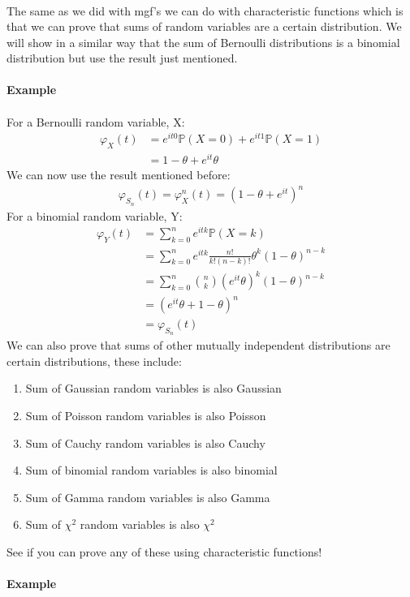 \documentclass[,oneside]{article}
\begin{document}
\begin{enumerate}
\begin{align*}
\end{align*}
The same as we did with mgf's we can do with characteristic functions which is that we can prove that sums of random variables are a certain distribution. We will show in a similar way that the sum of Bernoulli distributions is a binomial distribution but use the result just mentioned.\\ \\
\textbf{Example}\\ \\
For a Bernoulli random variable, X:
\begin{align*}
\varphi_X(t)&=e^{it 0}\mathbb{P}(X=0)+e^{it 1}\mathbb{P}(X=1)\\
&= 1-\theta+e^{it}\theta
\end{align*}
We can now use the result mentioned before:
\begin{align*}
\varphi_{S_n}(t)=\varphi_X^n(t)=(1-\theta+e^{it})^n
\end{align*}
For a binomial random variable, Y:
\begin{align*}
\varphi_{Y}(t)&=\sum_{k=0}^{n}e^{itk}\mathbb{P}(X=k)\\
&=\sum_{k=0}^{n}e^{itk}\frac{n!}{k!(n-k)!}\theta^k(1-\theta)^{n-k}\\
&=\sum_{k=0}^{n}\binom nk (e^{it}\theta)^k(1-\theta)^{n-k}\\
&=(e^{it}\theta +1-\theta)^n\\
&=\varphi_{S_n}(t)
\end{align*}
We can also prove that sums of other mutually independent distributions are certain distributions, these include:\\
\begin{enumerate}
\item Sum of Gaussian random variables is also Gaussian
\item Sum of Poisson random variables is also Poisson
\item Sum of Cauchy random variables is also Cauchy
\item Sum of binomial random variables is also binomial
\item Sum of Gamma random variables is also Gamma
\item Sum of $\chi^2$ random variables is also $\chi^2$
\end{enumerate}
See if you can prove any of these using characteristic functions!\\ \\
\textbf{Example}\\ \\

\end{enumerate}
\end{document}
